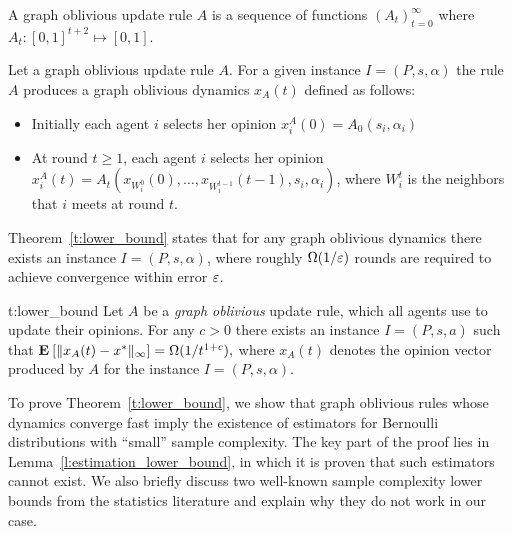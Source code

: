 \begin{definition}\label{d:opinion_dependent_dynamics}
A graph oblivious update rule $A$ is a sequence of
functions $(A_t)_{t=0}^\infty$ where
$A_t: [0,1]^{t+2}\mapsto [0,1]$.
\end{definition}

\begin{definition}\label{d:opinion_dependent_dynamics}
Let a graph oblivious update rule $A$. For a given instance $I=(P,s,\alpha)$
the rule $A$ produces a graph oblivious dynamics $x_A(t)$ defined as follows:
\begin{itemize}
 \item Initially each agent $i$ selects her opinion $x_i^A(0)=A_0(s_i,\alpha_i)$
 \item At round $t\geq 1$, each agent $i$ selects her opinion
   \(x_i^A(t)=A_t(x_{W_i^0}(0),\dots,x_{W_i^{t-1}}(t-1),s_i,\alpha_i)\),
where $W_i^t$ is the neighbors that $i$ meets at round $t$.
\end{itemize}
\end{definition}
Theorem~\ref{t:lower_bound} states that for any graph oblivious dynamics
there exists an instance $I = (P,s,\alpha)$, where roughly $\Omega(1/\varepsilon)$
rounds are required to achieve convergence within error $\varepsilon$.
\begin{reptheorem}{t:lower_bound}
  Let $A$ be a \emph{graph oblivious} update rule, which all agents use to
  update their opinions.  For any $c>0$ there exists an instance $I=(P,s,a)$
  such that
  \(
    \Exp{\norm{\infty}{x_A(t) - x^*}} = \Omega(1/t^{1+c}),
  \)
  where $x_A(t)$ denotes the opinion vector produced by $A$ for the instance
  $I=(P,s,\alpha)$.
\end{reptheorem}
%
To prove Theorem~\ref{t:lower_bound}, we show that 
graph oblivious rules whose dynamics converge fast
imply the existence of estimators for Bernoulli distributions with
\enquote{small} sample complexity. The key part of the proof lies 
in Lemma~\ref{l:estimation_lower_bound}, in which it is proven
that such estimators cannot exist.
We also briefly discuss two well-known sample complexity lower bounds
from the statistics literature and explain why they do not work in our case.

